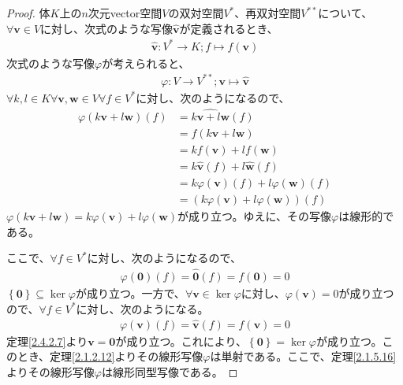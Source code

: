 \documentclass[dvipdfmx]{jsarticle}
\begin{document}
\begin{proof}
体$K$上の$n$次元vector空間$V$の双対空間$V^{*}$、再双対空間$V^{**}$について、$\forall\mathbf{v} \in V$に対し、次式のような写像$\widehat{\mathbf{v}}$が定義されるとき、
\begin{align*}
\widehat{\mathbf{v}}:V^{*} \rightarrow K;f \mapsto f\left( \mathbf{v} \right)
\end{align*}
次式のような写像$\varphi$が考えられると、
\begin{align*}
\varphi:V \rightarrow V^{**};\mathbf{v} \mapsto \widehat{\mathbf{v}}
\end{align*}
$\forall k,l \in K\forall\mathbf{v},\mathbf{w} \in V\forall f \in V^{*}$に対し、次のようになるので、
\begin{align*}
\varphi\left( k\mathbf{v} + l\mathbf{w} \right)(f) &= \widehat{k\mathbf{v} + l\mathbf{w}}(f)\\
&= f\left( k\mathbf{v} + l\mathbf{w} \right)\\
&= kf\left( \mathbf{v} \right) + lf\left( \mathbf{w} \right)\\
&= k\widehat{\mathbf{v}}(f) + l\widehat{\mathbf{w}}(f)\\
&= k\varphi\left( \mathbf{v} \right)(f) + l\varphi\left( \mathbf{w} \right)(f)\\
&= \left( k\varphi\left( \mathbf{v} \right) + l\varphi\left( \mathbf{w} \right) \right)(f)
\end{align*}
$\varphi\left( k\mathbf{v} + l\mathbf{w} \right) = k\varphi\left( \mathbf{v} \right) + l\varphi\left( \mathbf{w} \right)$が成り立つ。ゆえに、その写像$\varphi$は線形的である。\par
ここで、$\forall f \in V^{*}$に対し、次のようになるので、
\begin{align*}
\varphi\left( \mathbf{0} \right)(f) = \widehat{\mathbf{0}}(f) = f\left( \mathbf{0} \right) = 0
\end{align*}
$\left\{ \mathbf{0} \right\} \subseteq \ker\varphi$が成り立つ。一方で、$\forall\mathbf{v} \in \ker\varphi$に対し、$\varphi\left( \mathbf{v} \right) = 0$が成り立つので、$\forall f \in V^{*}$に対し、次のようになる。
\begin{align*}
\varphi\left( \mathbf{v} \right)(f) = \widehat{\mathbf{v}}(f) = f\left( \mathbf{v} \right) = 0
\end{align*}
定理\ref{2.4.2.7}より$\mathbf{v} = \mathbf{0}$が成り立つ。これにより、$\left\{ \mathbf{0} \right\} = \ker\varphi$が成り立つ。このとき、定理\ref{2.1.2.12}よりその線形写像$\varphi$は単射である。ここで、定理\ref{2.1.5.16}よりその線形写像$\varphi$は線形同型写像である。
\end{proof}
\end{document}
